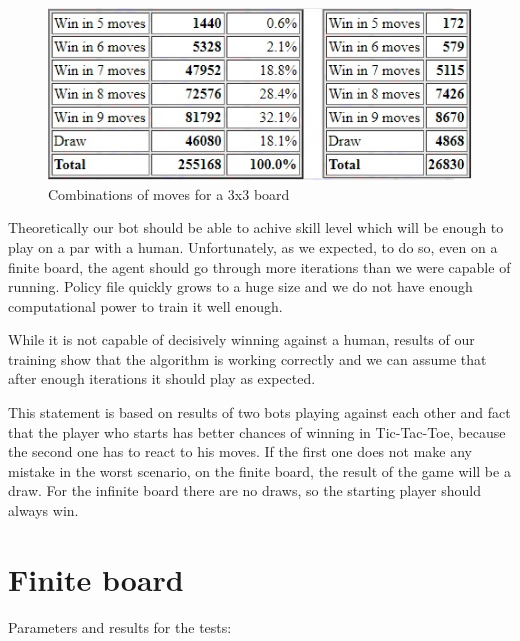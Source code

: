\documentclass[a4paper,12pt]{book}
\begin{document}
\begin{figure}[!h]
\includegraphics{./Images/3x3moves.jpg}
	\centering
	\caption{Combinations of moves for a 3x3 board\protect\footnotemark}
	\label{fig:Capture3}
\end{figure}

Theoretically our bot should be able to achive skill level which will be enough to play on a par with a human. Unfortunately, as we expected, to do so, even on a finite board, the agent should go through more iterations than we were capable of running. Policy file quickly grows to a huge size and we do not have enough computational power to train it well enough.

While it is not capable of decisively winning against a human, results of our training show that the algorithm is working correctly and we can assume that after enough iterations it should play as expected. 

This statement is based on results of two bots playing against each other and fact that the player who starts has better chances of winning in Tic-Tac-Toe, because the second one has to react to his moves. If the first one does not make any mistake in the worst scenario, on the finite board, the result of the game will be a draw. For the infinite board there are no draws, so the starting player should always win.

 	\section{Finite board}

Parameters and results for the tests:
\end{document}
